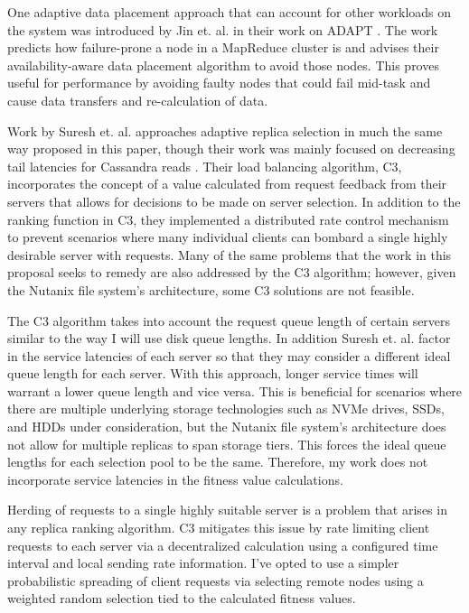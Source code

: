 \documentclass[12pt]{article}
\begin{document}
One adaptive data placement approach that can account for other workloads on
the system was introduced by Jin et. al. in their work on ADAPT
\cite{adapt2012}. The work
predicts how failure-prone a node in a MapReduce cluster is and advises their
availability-aware data placement algorithm to avoid those nodes. This proves
useful for performance by avoiding faulty nodes that could fail mid-task and
cause data transfers and re-calculation of data.

Work by Suresh et. al. approaches adaptive replica selection in much the same
way proposed in this paper, though their work was mainly focused on decreasing
tail latencies for Cassandra reads \cite{suresh2015}. Their load balancing algorithm, C3,
incorporates the concept of a value calculated from request feedback from their
servers that allows for decisions to be made on server selection. In addition
to the ranking function in C3, they implemented a distributed rate control
mechanism to prevent scenarios where many individual clients can bombard a
single highly desirable server with requests. Many of the same problems that
the work in this proposal seeks to remedy are also addressed by the C3
algorithm; however, given the Nutanix file system's architecture, some C3
solutions are not feasible.

The C3 algorithm takes into account the request queue length of certain servers
similar to the way I will use disk queue lengths. In addition Suresh et. al.
factor in the service latencies of each server so that they may consider a
different ideal queue length for each server. With this approach, longer
service times will warrant a lower queue length and vice versa. This is
beneficial for scenarios where there are multiple underlying storage
technologies such as NVMe drives, SSDs, and HDDs under consideration, but the
Nutanix file system's architecture does not allow for multiple replicas to span
storage tiers. This forces the ideal queue lengths for each selection pool to
be the same. Therefore, my work does not incorporate service latencies in the
fitness value calculations.

Herding of requests to a single highly suitable server is a problem that arises
in any replica ranking algorithm. C3 mitigates this issue by rate limiting
client requests to each server via a decentralized calculation using a
configured time interval and local sending rate information. I've opted to use
a simpler probabilistic spreading of client requests via selecting remote nodes
using a weighted random selection tied to the calculated fitness values.
\end{document}
